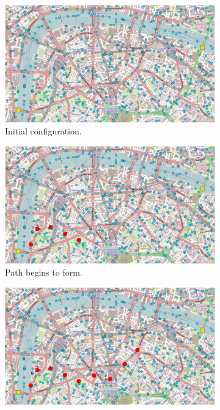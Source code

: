 \begin{figure}[ht!]
    \centering
    \begin{subfigure}[b]{.49\textwidth}
        \centering
        \includegraphics[width=\textwidth]{figures/protelis-example-a.png}
        \caption{Initial configuration.}
        \label{fig:protelis-example-a}
    \end{subfigure}
    \hfill
    \begin{subfigure}[b]{.49\textwidth}
        \centering
        \includegraphics[width=\textwidth]{figures/protelis-example-b.png}
        \caption{Path begins to form.}
        \label{fig:protelis-example-b}
    \end{subfigure}
    \hfill
    \begin{subfigure}[b]{.49\textwidth}
        \centering
        \includegraphics[width=\textwidth]{figures/protelis-example-c.png}

\end{subfigure}
\end{figure}
